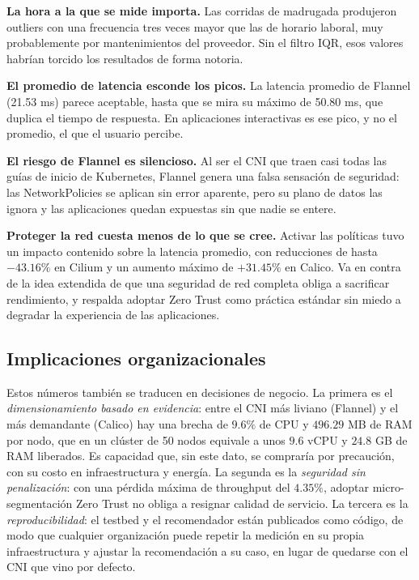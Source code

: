 \textbf{La hora a la que se mide importa.} Las corridas de madrugada produjeron outliers con una frecuencia tres veces mayor que las de horario laboral, muy probablemente por mantenimientos del proveedor. Sin el filtro IQR, esos valores habrían torcido los resultados de forma notoria.

\textbf{El promedio de latencia esconde los picos.} La latencia promedio de Flannel (21.53 ms) parece aceptable, hasta que se mira su máximo de 50.80 ms, que duplica el tiempo de respuesta. En aplicaciones interactivas es ese pico, y no el promedio, el que el usuario percibe.

\textbf{El riesgo de Flannel es silencioso.} Al ser el CNI que traen casi todas las guías de inicio de Kubernetes, Flannel genera una falsa sensación de seguridad: las NetworkPolicies se aplican sin error aparente, pero su plano de datos las ignora y las aplicaciones quedan expuestas sin que nadie se entere.

\textbf{Proteger la red cuesta menos de lo que se cree.} Activar las políticas tuvo un impacto contenido sobre la latencia promedio, con reducciones de hasta $-43.16\%$ en Cilium y un aumento máximo de $+31.45\%$ en Calico. Va en contra de la idea extendida de que una seguridad de red completa obliga a sacrificar rendimiento, y respalda adoptar Zero Trust como práctica estándar sin miedo a degradar la experiencia de las aplicaciones.

\subsection{Implicaciones organizacionales}

Estos números también se traducen en decisiones de negocio. La primera es el \emph{dimensionamiento basado en evidencia}: entre el CNI más liviano (Flannel) y el más demandante (Calico) hay una brecha de $9.6\%$ de CPU y $496.29$ MB de RAM por nodo, que en un clúster de 50 nodos equivale a unos $9.6$ vCPU y $24.8$ GB de RAM liberados. Es capacidad que, sin este dato, se compraría por precaución, con su costo en infraestructura y energía. La segunda es la \emph{seguridad sin penalización}: con una pérdida máxima de throughput del $4.35\%$, adoptar micro-segmentación Zero Trust no obliga a resignar calidad de servicio. La tercera es la \emph{reproducibilidad}: el testbed y el recomendador están publicados como código, de modo que cualquier organización puede repetir la medición en su propia infraestructura y ajustar la recomendación a su caso, en lugar de quedarse con el CNI que vino por defecto.

